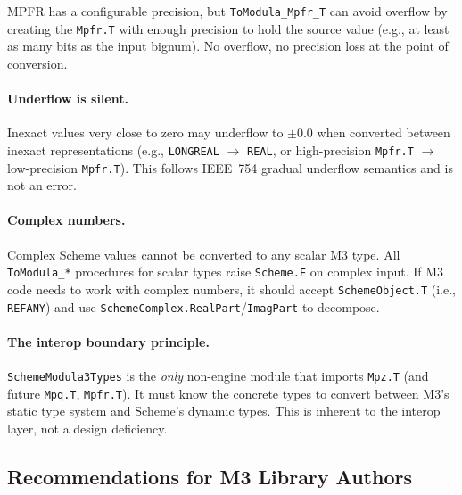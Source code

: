 \documentclass[12pt]{article}
\begin{document}
MPFR has a configurable precision, but {\tt ToModula\_Mpfr\_T}
can avoid overflow by creating the {\tt Mpfr.T} with enough
precision to hold the source value (e.g., at least as many
bits as the input bignum).  No overflow, no precision loss
at the point of conversion.

\paragraph{Underflow is silent.}
Inexact values very close to zero may underflow to $\pm 0.0$
when converted between inexact representations (e.g.,
{\tt LONGREAL} $\to$ {\tt REAL}, or high-precision {\tt Mpfr.T}
$\to$ low-precision {\tt Mpfr.T}).  This follows IEEE~754 gradual
underflow semantics and is not an error.

\paragraph{Complex numbers.}
Complex Scheme values cannot be converted to any scalar M3 type.
All {\tt ToModula\_*} procedures for scalar types raise
{\tt Scheme.E} on complex input.  If M3 code needs to work with
complex numbers, it should accept {\tt SchemeObject.T} (i.e.,
{\tt REFANY}) and use {\tt SchemeComplex.RealPart}/{\tt ImagPart}
to decompose.

\paragraph{The interop boundary principle.}
{\tt SchemeModula3Types} is the \emph{only} non-engine module
that imports {\tt Mpz.T} (and future {\tt Mpq.T}, {\tt Mpfr.T}).
It must know the concrete types to convert between M3's static
type system and Scheme's dynamic types.  This is inherent to the
interop layer, not a design deficiency.

\subsection{Recommendations for M3 Library Authors}
\label{sec:recommendations}
\end{document}
